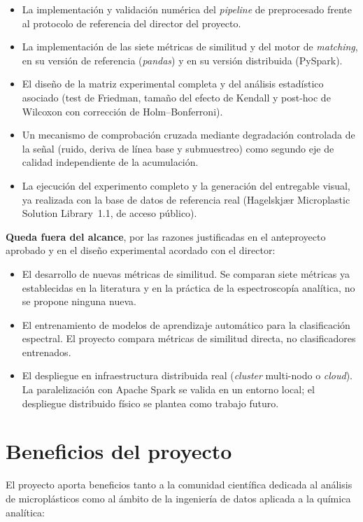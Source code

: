 \begin{itemize}
    \item La implementación y validación numérica del \textit{pipeline} de preprocesado frente al protocolo de referencia del director del proyecto.
    \item La implementación de las siete métricas de similitud y del motor de \textit{matching}, en su versión de referencia (\textit{pandas}) y en su versión distribuida (PySpark).
    \item El diseño de la matriz experimental completa y del análisis estadístico asociado (test de Friedman, tamaño del efecto de Kendall y post-hoc de Wilcoxon con corrección de Holm--Bonferroni).
    \item Un mecanismo de comprobación cruzada mediante degradación controlada de la señal (ruido, deriva de línea base y submuestreo) como segundo eje de calidad independiente de la acumulación.
    \item La ejecución del experimento completo y la generación del entregable visual, ya realizada con la base de datos de referencia real (Hagelskjær Microplastic Solution Library~1.1, de acceso público).
\end{itemize}

\textbf{Queda fuera del alcance}, por las razones justificadas en el anteproyecto aprobado y en el diseño experimental acordado con el director:

\begin{itemize}
    \item El desarrollo de nuevas métricas de similitud. Se comparan siete métricas ya establecidas en la literatura y en la práctica de la espectroscopía analítica, no se propone ninguna nueva.
    \item El entrenamiento de modelos de aprendizaje automático para la clasificación espectral. El proyecto compara métricas de similitud directa, no clasificadores entrenados.
    \item El despliegue en infraestructura distribuida real (\textit{cluster} multi-nodo o \textit{cloud}). La paralelización con Apache Spark se valida en un entorno local; el despliegue distribuido físico se plantea como trabajo futuro.
\end{itemize}

\section{Beneficios del proyecto}

El proyecto aporta beneficios tanto a la comunidad científica dedicada al análisis de microplásticos como al ámbito de la ingeniería de datos aplicada a la química analítica:

